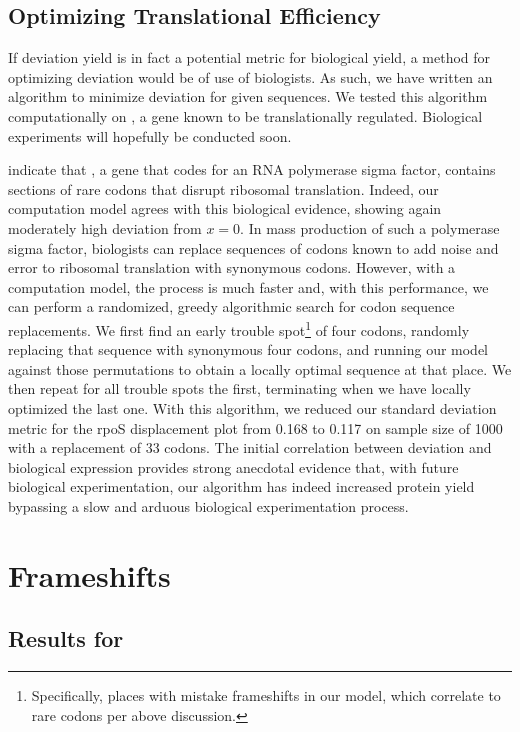 \documentclass[12pt]{article}
\numberwithin{equation}{section}
\begin{document}
\subsection{Optimizing Translational Efficiency}

If deviation yield is in fact a potential metric for biological yield,
a method for optimizing deviation would be of use of biologists.  As such,
we have written an algorithm to minimize deviation for given sequences.
We tested this algorithm computationally on \rpoS, a gene known to
be translationally regulated.  Biological experiments will hopefully be
conducted soon.


\citet{rpos:process} indicate that \rpoS, a gene that codes for an RNA
polymerase sigma factor, contains sections of rare codons that disrupt
ribosomal translation. Indeed, our computation model agrees with this
biological evidence, showing again moderately high deviation from $x =
0$. In mass production of such a polymerase sigma factor, biologists
can replace sequences of codons known to add noise and error to
ribosomal translation with synonymous codons. 
However, with a computation model, the process is much
faster and, with this performance, we can perform a randomized, greedy
algorithmic search for codon sequence replacements. We first find an
early trouble spot\footnote{Specifically, places with
  mistake frameshifts in our model, which correlate to rare codons per
  above discussion.} of four codons, randomly replacing that sequence
with synonymous four codons, and running our model against those
permutations to obtain a locally optimal sequence at that place. We
then repeat for all trouble spots the first, terminating when we have locally
optimized the last one. With this algorithm, we reduced our standard
deviation metric for the rpoS displacement plot from 0.168 to 0.117
on sample size of 1000 with a replacement of 33 codons. The
initial correlation between deviation and biological expression
provides strong anecdotal evidence that, with future biological
experimentation, our algorithm has indeed increased protein yield
bypassing a slow and arduous biological experimentation process.

\section{Frameshifts}

\subsection{Results for \prfB}
\end{document}
